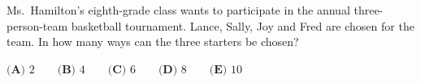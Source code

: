 Ms.\ Hamilton's eighth-grade class wants to participate in the annual three-person-team basketball tournament. Lance, Sally, Joy and Fred are chosen for the team. In how many ways can the three starters be chosen?

$\textbf{(A) } 2\qquad\textbf{(B) } 4\qquad\textbf{(C) } 6\qquad\textbf{(D) } 8\qquad\textbf{(E) } 10$
